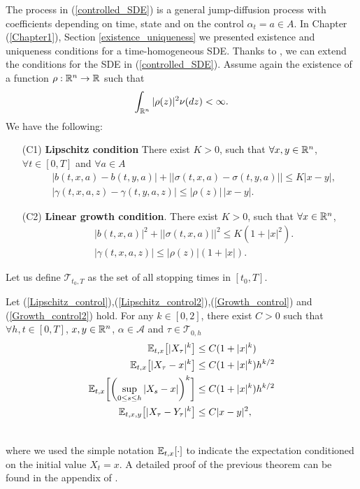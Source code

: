The process in (\ref{controlled_SDE}) is a general jump-diffusion process with coefficients depending on time, state and on the control $\alpha_t=a \in A$. 
In Chapter (\ref{Chapter1}), Section \ref{existence_uniqueness} we presented existence and uniqueness conditions for a time-homogeneous SDE. Thanks to \cite{Skorohod}, we can extend 
the conditions for the SDE in (\ref{controlled_SDE}).
Assume again the existence of a function $\rho : \mathbb{R}^n\to \mathbb{R} $ such that
\begin{equation}\label{rho}
 \int_{\mathbb{R}^n} |\rho(z)|^2 \nu(dz) < \infty.
\end{equation}
We have the following:
\begin{itemize}
 \item[(C1)] \textbf{Lipschitz condition} There exist $K >0$, such that $\forall x,y \in \mathbb{R}^n$, $\forall t \in [0,T]$ and $\forall a \in A$
 \begin{align}\label{Lipschitz_control}
  &|b(t,x,a) - b(t,y,a)| + || \sigma(t,x,a) - \sigma(t,y,a) || \leq K|x-y|,\\  
  & |\gamma(t,x,a,z) - \gamma(t,y,a,z)| \leq |\rho(z)|\,|x-y|. \label{Lipschitz_control2}
 \end{align}

 \item[(C2)] \textbf{Linear growth condition}. There exist $K>0$, such that $\forall x \in \mathbb{R}^n$,
 \begin{align}\label{Growth_control}
  &|b(t,x,a)|^2 + ||\sigma(t,x,a)||^2 \leq K (1+|x|^2).\\ 
  & |\gamma(t,x,a,z)| \leq |\rho(z)| (1+|x|). \label{Growth_control2}
 \end{align}
\end{itemize}
\begin{Definition}
 Let us define $\mathcal{T}_{t_0,T}$ as the set of all stopping times in $[t_0,T]$.
\end{Definition}
\begin{Theorem}
 Let (\ref{Lipschitz_control}),(\ref{Lipschitz_control2}),(\ref{Growth_control}) and (\ref{Growth_control2}) hold. 
 For any $k \in [0,2]$, there exist $C>0$ such that $\forall h,t \in [0,T]$, $x,y \in \mathbb{R}^n$, 
 $\alpha \in \mathcal{A}$ and $\tau \in \mathcal{T}_{0,h}$
 \begin{align}
  \mathbb{E}_{t,x}\bigl[ |X_{\tau}|^k \bigr] &\leq C (1+|x|^k) \\ \label{cond_2}
  \mathbb{E}_{t,x}\bigl[ |X_{\tau} - x|^k \bigr] &\leq C (1+|x|^k)h^{k/2} \\ \label{cond_3}
  \mathbb{E}_{t,x}\biggl[ \biggl( \sup_{0\leq s\leq h} |X_{s} - x| \biggr)^k \biggr] &\leq C (1+|x|^k)h^{k/2} \\ 
  \mathbb{E}_{t,x,y}\bigl[ |X_{\tau} - Y_{\tau}|^k \bigr] &\leq C |x-y|^2, \\ \nonumber
 \end{align}
\end{Theorem}
where we used the simple notation $\mathbb{E}_{t,x}[\cdot]$ to indicate the expectation conditioned on the initial value $X_t=x$.   
A detailed proof of the previous theorem can be found in the appendix of \cite{Ph98}.

